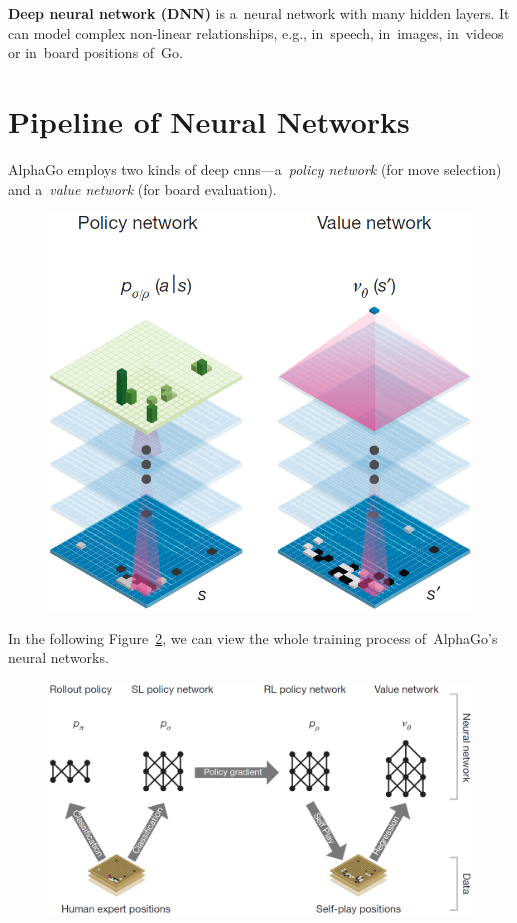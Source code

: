 \textbf{Deep neural network (DNN)} is a~neural network with many hidden layers.
It can model complex non-linear relationships, e.g., in~speech, in~images, in~videos or in~board positions of~Go.

\section{Pipeline of Neural Networks}
AlphaGo employs two kinds of deep \acrshort{cnn}s---a~\emph{policy network} (for move selection) and a~\emph{value network} (for board evaluation).
\begin{figure}[H]
  \centering
  \includegraphics[width=.5\textwidth]{../img/policy_and_value_network.png}
  \label{fig:policy_vs_value_nets}
\end{figure}

In the following Figure~\ref{fig:neural_nets_pipeline}, we can view the whole training process of~AlphaGo's neural networks.
\begin{figure}[H]
  \centering
  \includegraphics[width=.7\textwidth]{../img/neural_nets_pipeline.png}
  \label{fig:neural_nets_pipeline}
\end{figure}

